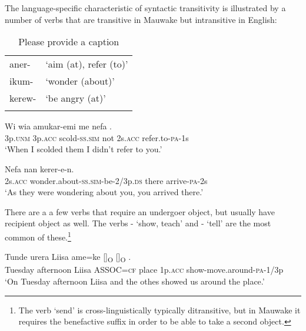 The language-specific characteristic of syntactic transitivity \citep[49--51]{Kittila2002} is illustrated by a number of verbs that are transitive in Mauwake but intransitive in English:

\begin{table}
\caption{Please provide a caption}
\label{} 
\begin{tabular}{ll}
\mytoprule
aner- &`aim (at), refer (to)'\\
ikum- &`wonder (about)'\\
kerew- &`be angry (at)'\\
\mybottomrule
\end{tabular}

\end{table}

\ea%
\label{ex:3:x302}
\gll Wi wia amukar-emi me nefa . \\
3p.\textsc{unm} 3p.\textsc{acc} scold-\textsc{ss}.\textsc{sim} not 2s.\textsc{acc} refer.to-\textsc{pa}-1s \\
\glt`When I scolded them I didn't refer to you.'
\z

\ea%
\label{ex:3:x303}
\gll Nefa  nan kerer-e-n. \\
2s.\textsc{acc} wonder.about-\textsc{ss}.\textsc{sim}-be-2/3p.\textsc{ds} there arrive-\textsc{pa}-2s\\
\glt`As they were wondering about you, you arrived there.'
\z

There are a a few verbs that require an undergoer object, but usually have recipient object as well. The verbs - `show, teach' and - `tell' are the most common of these.\footnote{The verb `send' is cross-linguistically typically ditransitive, but in Mauwake it requires the benefactive suffix in order to be able to take a second object.} 

\ea%
\label{ex:3:x1838}
\gll Tunde urera Liisa ame=ke []\textsubscript{O} []\textsubscript{O} \textstyleEmphasizedVernacularWords{-}\textstyleEmphasizedVernacularWords{-}.\\
Tuesday afternoon Liisa ASSOC=\textsc{cf} place 1p.\textsc{acc} show-move.around-\textsc{pa}-1/3p\\
\glt`On Tuesday afternoon Liisa and the othes showed us around the place.'
\z

